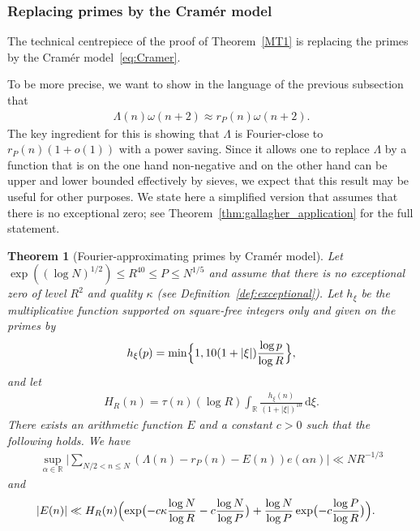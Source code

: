 \documentclass[12pt]{amsart}
\newtheorem{theorem}{Theorem}[section]
\theoremstyle{definition}
\theoremstyle{remark}
\numberwithin{equation}{section}
\newcommand{\1}{\mathbf{1}}
\newcommand{\R}{{\mathbb R}}
\renewcommand\d{\,\mathrm{d}}
\begin{document}
\subsubsection{Replacing primes by the Cram\'er model}
The technical centrepiece of the proof of Theorem~\ref{MT1} is replacing the primes by the Cram\'er model~\eqref{eq:Cramer}. 


To be more precise, we want to show in the language of the previous subsection that
\begin{align}\label{eq:LambdatorP}
    \Lambda(n)\omega(n+2)\approx r_P(n)\omega(n+2).
\end{align}
The key ingredient for this is showing that $\Lambda$ is Fourier-close to $r_P(n)(1+o(1))$ with a power saving. Since it allows one to replace $\Lambda$ by a function that is on the one hand non-negative and on the other hand can be upper and lower bounded effectively by sieves, we expect that this result may be useful for other purposes. We state here a simplified version that assumes that there is no exceptional zero; see Theorem~\ref{thm:gallagher_application} for the full statement. 

\begin{theorem}[Fourier-approximating primes by Cram\'er model]\label{thm:F-P-C_intro}  Let $\exp((\log N)^{1/2})\leq R^{40}\leq P\leq N^{1/5}$ and assume that there is no exceptional zero of level $R^2$ and quality $\kappa$ (see Definition~\ref{def:exceptional}). Let $h_\xi$ be the multiplicative function supported on square-free integers only and given on the primes by 
 \begin{align*}
        h_{\xi}(p)=\min\Bigl\{1,10(1+|\xi|)\frac{\log p}{\log R} \Bigr\},
    \end{align*}
and let 
\begin{align*}
    H_R(n)=\tau(n)(\log R) \int_{\mathbb{R}} \frac{h_{\xi}(n)}{(1+|\xi|)^{10}}\d \xi.
\end{align*}
There exists an arithmetic function $E$ and a constant $c>0$ such that the following holds. We have
		\begin{align*}
		  \sup_{\alpha \in \R} \bigl| \sum_{N/2<n\leq N}(\Lambda(n)-r_{P}(n)-E(n))e(\alpha n) \bigr| \ll N R^{-1/3}
		\end{align*}
	    and
	   \begin{align*}
          |E(n)|&\ll H_R(n) \Bigl(\exp\bigl( -c \kappa \frac{\log N}{\log R} -c \frac{\log N}{\log P}\bigr)+\frac{\log N}{\log P}\exp\bigl(-c\frac{\log P}{\log R} \bigr)\Bigr).
	   \end{align*}
\end{theorem}
\end{document}

